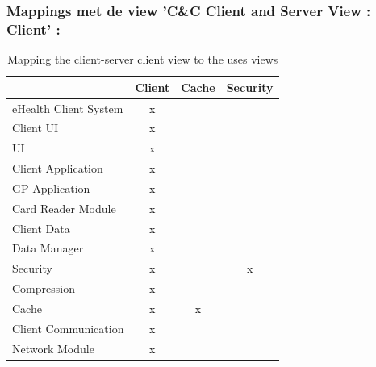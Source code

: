 \documentclass[a4paper,10pt]{article}
\begin{document}
\subsubsection*{Mappings met de view 'C\&C Client and Server View : Client' :}
\begin{table}[h!]
\begin{center}
 \begin{tabular}{l | c | c | c |} 
 & Client & Cache & Security\\ \hline
eHealth Client System & x & & \\ \hline
\hspace{6pt}Client UI & x & & \\ \hline
\hspace{12pt}UI & x & & \\ \hline
\hspace{6pt}Client Application & x & & \\ \hline
\hspace{12pt}GP Application & x & & \\ \hline
\hspace{12pt}Card Reader Module & x & & \\ \hline
\hspace{6pt}Client Data & x & & \\ \hline
\hspace{12pt}Data Manager & x & & \\ \hline
\hspace{12pt}Security & x & & x \\ \hline
\hspace{12pt}Compression & x & & \\ \hline
\hspace{12pt}Cache & x & x & \\ \hline
\hspace{6pt}Client Communication & x & & \\ \hline
\hspace{12pt}Network Module & x & & \\ \hline
\end{tabular}
\caption{Mapping the client-server client view to the uses views}
\end{center}
\end{table}

\clearpage
\end{document}
